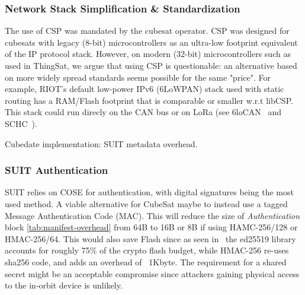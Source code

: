 \subsubsection{Network Stack Simplification \& Standardization}
The use of CSP was mandated by the cubesat operator. CSP was designed for cubesats with legacy (8-bit) microcontrollers as an ultra-low footprint equivalent of the IP protocol stack.
However, on modern (32-bit) microcontrollers such as used in ThingSat, we argue that using CSP is questionable: an alternative based on more widely spread standards seems possible for the same "price". For example, RIOT's default low-power IPv6 (6LoWPAN) stack used with static routing has a RAM/Flash footprint that is comparable or smaller w.r.t libCSP. This stack could run direcly on the CAN bus or on LoRa (see 6loCAN~\cite{wachter20206locan01} and SCHC~\cite{rfc8724}).

\iffalse
In fact, taking as base
 CubeSat sub-systems developers the same features as an
TCP/IP stack without the overhead of the IP header, allowing to run on constrained
systems with under 4kB of RAM. Unless running on this kind of very constrained
devices using CSP can be contested. A minimal CoAP server example running on
LibCSP or RIOTs default IPv6/UDP network stack (GNRC) yields similar numbers of RAM/Flash
usage: 10KB\/30KB (CSP) vs 8KB/31KB (GNRC). Optimal compression of an Ipv6 header
can shrink the size from 48B to 4B, comparable to CSP2.0 3B header.
Furthermore  6loCAN\cite{wachter20206locan01}, SCHC\cite{rfc8724}, allow to
optimize IPv6 for CAN-BUS or LoRa network. What is gained in simplicity is eventually
lost by using a not standard network stack, i.e. using standard application
layer protocols.
\fi

\begin{table}[t]

\begin{adjustbox}{width=0.5\columnwidth,center}
    \centering
    
\end{adjustbox}
\caption{Cubedate implementation: SUIT metadata overhead.}
\label{tab:manifest-overhead}
\end{table}

\subsubsection{SUIT Authentication}

SUIT relies on COSE for authentication, with digital signatures being the most
used method. A viable alternative for CubeSat maybe to instead use a tagged Message
Authentication Code (MAC). This will reduce the size of \textit{Authentication} block
\ref*{tab:manifest-overhead} from 64B to 16B or 8B if using HAMC-256/128
or HMAC-256/64. This would also save Flash since as seen in~\cite{zandberg2019secure}
the ed25519 library accounts for roughly 75\% of the crypto flash budget, while HMAC-256
re-uses sha256 code, and adds an overhead of ~1Kbyte. The requirement for a shared secret
might be an acceptable compromise since attackers gaining physical access to the
in-orbit device is unlikely.

